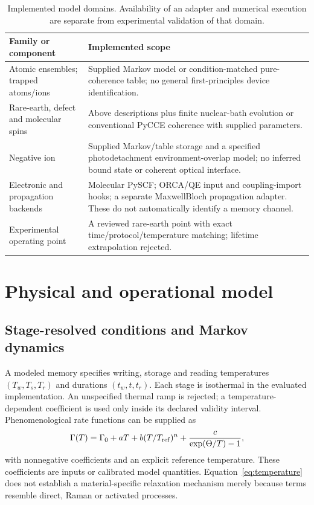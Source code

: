 \documentclass[11pt,a4paper]{article}
\begin{document}
\begin{table}[tbp]
\centering\small
\begin{tabular}{p{.29\linewidth}p{.61\linewidth}}
\toprule Family or component & Implemented scope \\
\midrule
Atomic ensembles; trapped atoms/ions & Supplied Markov model or condition-matched pure-coherence table; no general first-principles device identification.\\
Rare-earth, defect and molecular spins & Above descriptions plus finite nuclear-bath evolution or conventional PyCCE coherence with supplied parameters.\\
Negative ion & Supplied Markov/table storage and a specified photodetachment environment-overlap model; no inferred bound state or coherent optical interface.\\
Electronic and propagation backends & Molecular PySCF; ORCA/QE input and coupling-import hooks; a separate MaxwellBloch propagation adapter. These do not automatically identify a memory channel.\\
Experimental operating point & A reviewed rare-earth point with exact time/protocol/temperature matching; lifetime extrapolation rejected.\\
\bottomrule
\end{tabular}
\caption{Implemented model domains. Availability of an adapter and numerical execution are separate from experimental validation of that domain.}
\label{tab:branches}
\end{table}

\section{Physical and operational model}
\label{sec:model}
\subsection{Stage-resolved conditions and Markov dynamics}
A modeled memory specifies writing, storage and reading temperatures $(T_w,T_s,T_r)$ and durations $(t_w,t,t_r)$. Each stage is isothermal in the evaluated implementation. An unspecified thermal ramp is rejected; a temperature-dependent coefficient is used only inside its declared validity interval. Phenomenological rate functions can be supplied as
\begin{equation}
\Gamma(T)=\Gamma_0+aT+b(T/T_{\rm ref})^n+
\frac{c}{\exp(\Theta/T)-1},
\label{eq:temperature}
\end{equation}
with nonnegative coefficients and an explicit reference temperature. These coefficients are inputs or calibrated model quantities. Equation~\eqref{eq:temperature} does not establish a material-specific relaxation mechanism merely because terms resemble direct, Raman or activated processes.
\end{document}
